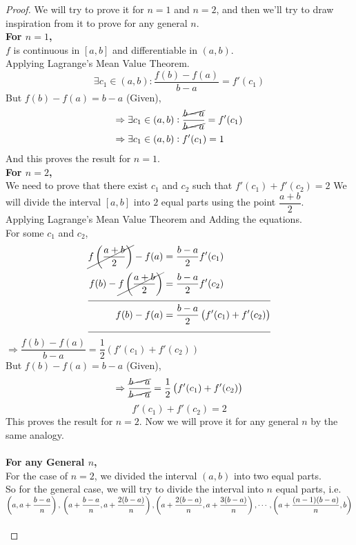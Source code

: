 \documentclass[14]{article}
\theoremstyle{definition}
\theoremstyle{case}
\begin{document}
\begin{proof}
We will try to prove it for $n = 1$ and $n = 2$, and then we'll try to draw inspiration from it to prove for any general $n$.\\
\textbf{For $n = 1$,}\\
$f$ is continuous in $[a, b]$ and differentiable in $(a, b)$.\\
Applying Lagrange's Mean Value Theorem.\\
\[
\exists c_1 \in (a, b) : \dfrac{f(b) - f(a)}{b - a} = f'(c_1)
\]
But $f(b) - f(a) = b - a$ (Given),
\begin{align*}
\Rightarrow\exists c_1 \in (a, b) &: \dfrac{\cancel{b - a}}{\cancel{b - a}} = f'(c_1)\\
\Rightarrow\exists c_1 \in (a, b) &: f'(c_1) = 1
\end{align*}
And this proves the result for $n = 1$.\\
\textbf{For $n = 2$,}\\
We need to prove that there exist $c_1$ and $c_2$ such that $f'(c_1) + f'(c_2) = 2$
We will divide the interval $[a, b]$ into $2$ equal parts using the point $\dfrac{a + b}{2}$.\\
Applying Lagrange's Mean Value Theorem and Adding the equations.\\
For some $c_1$ and $c_2$,
\begin{align*}
\cancel{f\left(\dfrac{a+b}{2}\right)} - f(a) &= \dfrac{b-a}{2} f'(c_1)\\
f(b) - \cancel{f\left(\dfrac{a+b}{2}\right)} &= \dfrac{b - a }{2} f'(c_2)\\
\cline{0-1}
f(b) - f(a) &= \dfrac{b - a}{2} \left(f'(c_1) + f'(c_2)\right)\\
\cline{0-1}
\end{align*}
$\Rightarrow \dfrac{f(b) - f(a)}{b - a} = \dfrac12 \left(f'(c_1) + f'(c_2)\right)$\\
But $f(b) - f(a) = b - a$ (Given),
\[\Rightarrow \dfrac{\cancel{b - a}}{\cancel{b - a}} = \dfrac12 \left(f'(c_1) + f'(c_2)\right) \]
\[f'(c_1) + f'(c_2) = 2\]
This proves the result for $n = 2$.
\pagebreak
Now we will prove it for any general $n$ by the same analogy.\\\\
\textbf{For any General $n$,}\\
For the case of $n = 2$, we divided the interval $(a, b)$ into two equal parts.\\
So for the general case, we will try to divide the interval into $n$ equal parts, i.e. $\left(a, a + \dfrac{b - a}{n}\right),\\ \left(a + \dfrac{b - a}{n}, a + \dfrac{2(b - a)}{n}\right), \left(a + \dfrac{2(b - a)}{n}, a + \dfrac{3(b - a)}{n}\right), \cdots, \left(a + \dfrac{(n-1)(b - a)}{n}, b\right)$\\\\

\end{proof}
\end{document}
